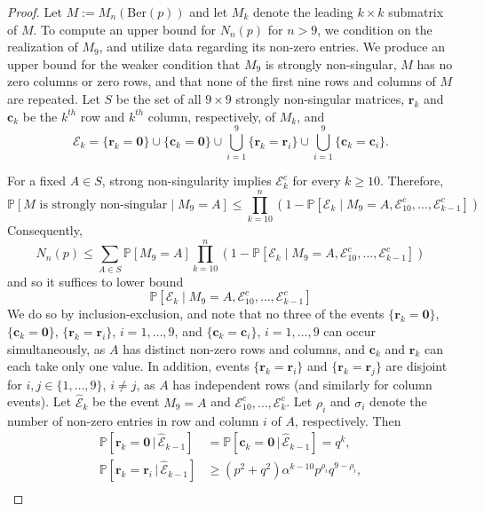 \documentclass[reqno]{amsart}
\numberwithin{equation}{section}
\begin{document}
\begin{proof}
Let $M:= M_n(\mathrm{Ber}(p))$ and let $M_k$ denote the leading $k \times k$ submatrix of $M$. To compute an upper bound for $N_n(p)$ for $n > 9$, we condition on the realization of $M_9$, and utilize data regarding its non-zero entries. We produce an upper bound for the weaker condition that $M_9$ is strongly non-singular, $M$ has no zero columns or zero rows, and that none of the first nine rows and columns of $M$ are repeated. Let $S$ be the set of all $9\times 9$ strongly non-singular matrices, $\bm{r}_k$ and $\bm{c}_k$ be the $k^{th}$ row and $k^{th}$ column, respectively, of $M_k$, and \[\mathcal{E}_k = \{ \bm{r}_k = \bm{0}\} \cup \{ \bm{c}_k = \bm{0}\}\cup \bigcup_{i=1}^9 \{ \bm{r}_k = \bm{r}_i\} \cup \bigcup_{i=1}^9 \{ \bm{c}_k = \bm{c}_i\}. \]

For a fixed $A\in S$, strong non-singularity implies $\mathcal E_k^c$ for every $k\ge10$. Therefore,
\[
\mathbb{P}\left[M\text{ is strongly non-singular}\mid M_9=A\right] \le \prod_{k=10}^n \left(1-\mathbb{P}\left[\mathcal E_k \mid M_9=A,\mathcal E_{10}^c,\ldots,\mathcal E_{k-1}^c \right] \right)
\]
Consequently,
\[
N_n(p) \le \sum_{A \in S} \mathbb{P}[M_9 = A] \prod_{k = 10}^n \left(
1- \mathbb{P}\left[ \mathcal{E}_k \mid M_9 = A, \mathcal{E}_{10}^c,\ldots, \mathcal{E}_{k-1}^c \right] \right)
\]
and so it suffices to lower bound
\[
\mathbb{P}\left[ \mathcal{E}_k \mid M_9 = A, \mathcal{E}_{10}^c,\ldots, \mathcal{E}_{k-1}^c \right]
\]
We do so by inclusion-exclusion, and note that no three of the events $\{ \bm{r}_k = \bm{0}\}$, $\{ \bm{c}_k = \bm{0}\}$, $\{ \bm{r}_k = \bm{r}_i\}$, $i = 1,\ldots, 9$, and  $\{ \bm{c}_k = \bm{c}_i\}$, $i = 1,\ldots,9$ can occur simultaneously, as $A$ has distinct non-zero rows and columns, and $\bm{c}_k$ and $\bm{r}_k$ can each take only one value. In addition, events $\{\bm{r}_k = \bm{r}_i\}$ and $\{\bm{r}_k = \bm{r}_j\}$ are disjoint for $i,j \in \{1,\ldots,9\}$, $i \ne j$, as $A$ has independent rows (and similarly for column events). Let $ \mathcal{\hat E}_{k}$ be the event $M_9 = A$ and $\mathcal{E}_{10}^c,\ldots,\mathcal{E}_{k}^c$. Let $\rho_i$ and $\sigma_i$ denote the number of non-zero entries in row and column $i$ of $A$, respectively. Then
\begin{align*}
\mathbb{P}\left[\bm{r}_k = \bm{0} \, | \, \mathcal{\hat E}_{k-1}\right] &= \mathbb{P}\left[\bm{c}_k = \bm{0} \, | \, \mathcal{\hat E}_{k-1}\right] = q^k, \\
\mathbb{P}\left[\bm{r}_k = \bm{r}_i \, | \, \mathcal{\hat E}_{k-1}\right] &\ge (p^2 + q^2) \alpha^{k-10} p^{\rho_i} q^{9-\rho_i}, \\

\end{align*}
\end{proof}
\end{document}
